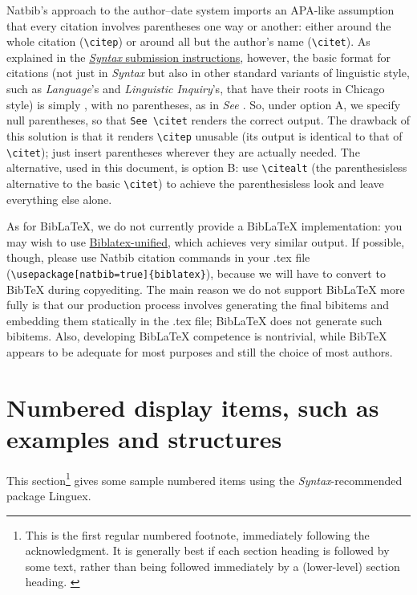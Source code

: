 \documentclass[letterpaper,12pt, twoside]{article}
\begin{document}
Natbib's approach to the author--date system imports an APA-like assumption that every citation involves parentheses one way or another: either around the whole citation (\verb|\citep|) or around all but the author's name (\verb|\citet|). As explained in the \href{https://docs.google.com/document/d/1T0zHwq2b53VnqF18c8PKd-W_FWKqhKF0gkbBndoxj28/edit?usp=sharing}{\emph{Syntax} submission instructions}, however, the basic format for citations (not just in \emph{Syntax} but also in other standard variants of linguistic style, such as \emph{Language}'s and \emph{Linguistic Inquiry}'s, that have their roots in Chicago style) is simply \emph{\citealt{journalarticle}}, with no parentheses, as in \emph{See \citealt{journalarticle}}. So, under option A, we specify null parentheses, so that \verb|See \citet| renders the correct output. The drawback of this solution is that it renders \verb|\citep| unusable (its output is identical to that of \verb|\citet|); just insert parentheses wherever they are actually needed. The alternative, used in this document, is option B: use \verb|\citealt| (the parenthesisless alternative to the basic \verb|\citet|) to achieve the parenthesisless look and leave everything else alone.

As for BibLaTeX, we do not currently provide a BibLaTeX implementation: you may wish to use \href{https://ctan.org/pkg/biblatex-unified}{Biblatex-unified}, which achieves very similar output. If possible, though, please use  Natbib citation commands in your .tex file (\verb|\usepackage[natbib=true]{biblatex}|), because we will have to convert to BibTeX during copyediting. The main reason we do not support BibLaTeX more fully is that our production process involves generating the final bibitems and embedding them statically in the .tex file; BibLaTeX does not generate such bibitems. Also, developing BibLaTeX competence is nontrivial, while BibTeX appears to be adequate for most purposes and still the choice of most authors.



\section{Numbered display items, such as examples and structures}\label{secexs}
This section\footnote{This is the first regular numbered footnote, immediately following the acknowledgment. It is generally best if each section heading is followed by some text, rather than being followed immediately by a (lower-level) section heading. \label{padding}}   gives some sample numbered items using the \emph{Syntax}-recommended package {Linguex}. 
\end{document}
